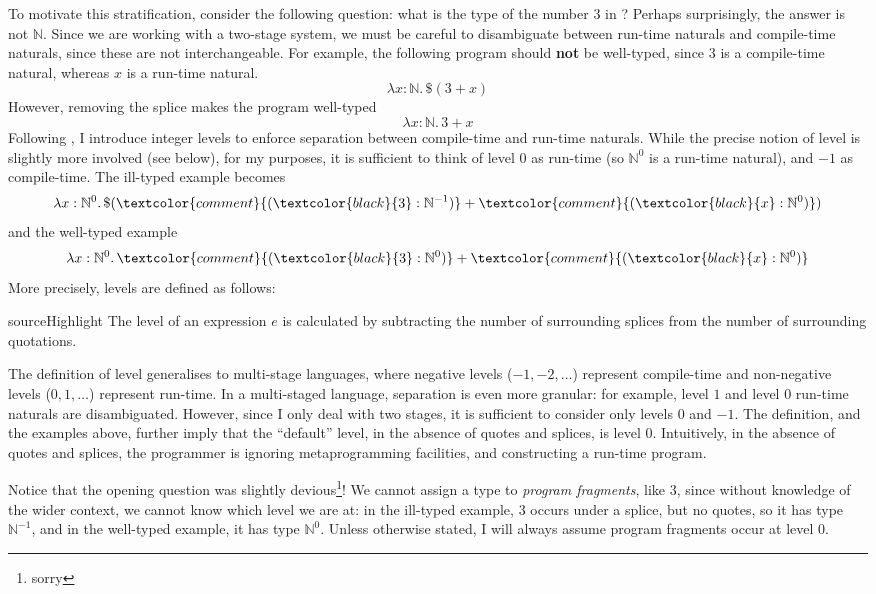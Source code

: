   To motivate this stratification, consider the following question: what is the type of the number $3$ in \sourceLang{}? Perhaps surprisingly, the answer is not $\mathbb{N}$. Since we are working with a two-stage system, we must be careful to disambiguate between run-time naturals and compile-time naturals, since these are not interchangeable. For example, the following program should \textbf{not} be well-typed, since $3$ is a compile-time natural, whereas $x$ is a run-time natural. 
  \[\lambda x: \mathbb{N}. \, \$(3 + x)\]
  However, removing the splice makes the program well-typed
  \[\lambda x: \mathbb{N}. \, 3 + x\]
  Following \citet{xie-2023}, I introduce integer levels to enforce separation between compile-time and run-time naturals. While the precise notion of level is slightly more involved (see below), for my purposes, it is sufficient to think of level $0$ as run-time (so $\mathbb{N}^0$ is a run-time natural), and $-1$ as compile-time. The ill-typed example becomes
  \[\lambda x: \mathbb{N}^0. \, \$(\textcolor{comment}{(\textcolor{black}{3}:\mathbb{N}^{-1})} + \textcolor{comment}{(\textcolor{black}{x}:\mathbb{N}^{0})})\]
  and the well-typed example 
  \[\lambda x: \mathbb{N}^0. \, \textcolor{comment}{(\textcolor{black}{3}:\mathbb{N}^{0})} + \textcolor{comment}{(\textcolor{black}{x}:\mathbb{N}^{0})}\]
  More precisely, levels are defined as follows:

  \begin{definition}[Level]{sourceHighlight}
    The level of an expression $e$ is calculated by subtracting the number of surrounding splices from the number of surrounding quotations.
  \end{definition}

  The definition of level generalises to multi-stage languages, where negative levels ($-1, -2, \ldots$) represent compile-time and non-negative levels ($0, 1, \ldots$) represent run-time. In a multi-staged language, separation is even more granular: for example, level $1$ and level $0$ run-time naturals are disambiguated. However, since I only deal with two stages, it is sufficient to consider only levels $0$ and $-1$. The definition, and the examples above, further imply that the ``default'' level, in the absence of quotes and splices, is level $0$. Intuitively, in the absence of quotes and splices, the programmer is ignoring metaprogramming facilities, and constructing a run-time program. 


  Notice that the opening question was slightly devious\footnote{sorry}! We cannot assign a type to \textit{program fragments}, like $3$, since without knowledge of the wider context, we cannot know which level we are at: in the ill-typed example, $3$ occurs under a splice, but no quotes, so it has type $\mathbb{N}^{-1}$, and in the well-typed example, it has type $\mathbb{N}^0$. Unless otherwise stated, I will always assume program fragments occur at level $0$.

